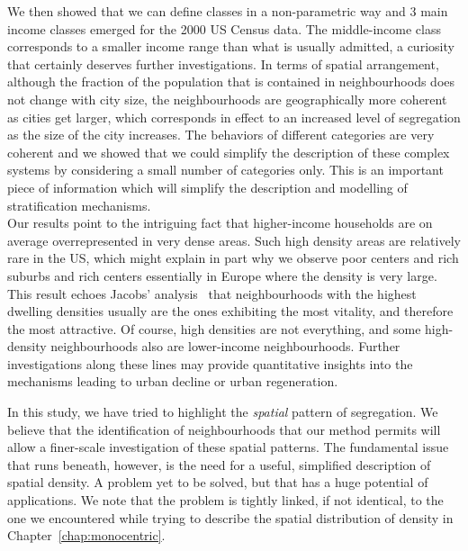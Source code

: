 We then showed that we can define classes in a non-parametric way and 3 main
income classes emerged for the 2000 US Census data. The middle-income class
corresponds to a smaller income range than what is usually admitted, a curiosity
that certainly deserves further investigations. In terms of spatial arrangement,
although the fraction of the population that is contained in neighbourhoods does
not change with city size, the neighbourhoods are geographically more coherent
as cities get larger, which corresponds in effect to an increased level of
segregation as the size of the city increases. The behaviors of different
categories are very coherent and we showed that we could simplify the
description of these complex systems by considering a small number of categories
only. This is an important piece of information which will simplify the
description and modelling of stratification mechanisms.\\

Our results point to the intriguing fact that higher-income households are on
average overrepresented in very dense areas. Such high density areas are
relatively rare in the US, which might explain in part why we observe poor
centers and rich suburbs and rich centers essentially in Europe where the
density is very large. This result echoes Jacobs' analysis~\cite{Jacobs:1961}
that neighbourhoods with the highest dwelling densities usually are the ones
exhibiting the most vitality, and therefore the most attractive. Of course, high
densities are not everything, and some high-density neighbourhoods also are
lower-income neighbourhoods. Further investigations along these lines may
provide quantitative insights into the mechanisms leading to urban decline or
urban regeneration. 

In this study, we have tried to highlight the \emph{spatial} pattern of
segregation.  We believe that the identification of neighbourhoods that our
method permits will allow a finer-scale investigation of these spatial patterns.
The fundamental issue that runs beneath, however,  is the need for a useful, simplified
description of spatial density. A problem yet to be solved, but
that has a huge potential of applications. We note that the problem is tightly
linked, if not identical, to the one we encountered while trying to describe the
spatial distribution of density in Chapter~\ref{chap:monocentric}.



